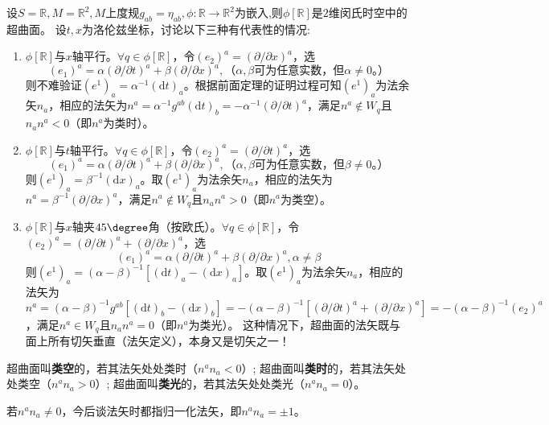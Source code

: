 \begin{example}
	设$S = \mathbb{R}, M = \mathbb{R}^2, M$上度规$g_{ab} = \eta_{ab}, \phi \colon \mathbb{R} \to \mathbb{R}^2$为嵌入,则$\phi[\mathbb{R}]$是$2$维闵氏时空中的超曲面。
	设$t, x$为洛伦兹坐标，讨论以下三种有代表性的情况:
	\begin{enumerate}[（1）]
		\item $\phi[\mathbb{R}]$与$x$轴平行。$\forall q \in \phi[\mathbb{R}]$，令$(e_2)^a = (\partial / \partial x)^a$，选
		$$(e_1)^a = \alpha(\partial / \partial t)^a + \beta(\partial / \partial x)^a, \text{（$\alpha, \beta$可为任意实数，但$\alpha \neq 0$。）}$$
		则不难验证$(e^1)_a = \alpha^{-1}(\mathrm{d}t)_a$。根据前面定理的证明过程可知$(e^1)_a$为法余矢$n_a$，相应的法矢为$n^a = \alpha^{-1}g^{ab}(\mathrm{d}t)_b = -\alpha^{-1}(\partial / \partial t)^a$，满足$n^a \notin W_q$且$n_an^a < 0$（即$n^a$为类时）。
		\item $\phi[\mathbb{R}]$与$t$轴平行。$\forall q \in \phi[\mathbb{R}]$，令$(e_2)^a = (\partial / \partial t)^a$，选
		$$(e_1)^a = \alpha(\partial / \partial t)^a + \beta(\partial / \partial x)^a, \text{（$\alpha, \beta$可为任意实数，但$\beta \neq 0$。）}$$
		则$(e^1)_a = \beta^{-1}(\mathrm{d}x)_a$。取$(e^1)_a$为法余矢$n_a$，相应的法矢为$n^a = \beta^{-1}(\partial / \partial x)^a$，满足$n^a \notin W_q$且$n_an^a > 0$（即$n^a$为类空）。
		\item $\phi[\mathbb{R}]$与$x$轴夹$45\degree$角（按欧氏）。$\forall q \in \phi[\mathbb{R}]$，令$(e_2)^a = (\partial / \partial t)^a + (\partial / \partial x)^a$，选
		$$(e_1)^a = \alpha(\partial / \partial t)^a + \beta(\partial / \partial x)^a, \alpha \neq \beta$$
		则$(e^1)_a = (\alpha - \beta)^{-1}[(\mathrm{d}t)_a - (\mathrm{d}x)_a]$。取$(e^1)_a$为法余矢$n_a$，相应的法矢为$n^a = (\alpha - \beta)^{-1}g^{ab}[(\mathrm{d}t)_b - (\mathrm{d}x)_b] = -(\alpha - \beta)^{-1}[(\partial / \partial t)^a + (\partial / \partial x)^a] = -(\alpha - \beta)^{-1}(e_2)^a$，满足$n^a \in W_q$且$n_an^a = 0$（即$n^a$为类光）。
		这种情况下，超曲面的法矢既与面上所有切矢垂直（法矢定义），本身又是切矢之一！
	\end{enumerate}
\end{example}

\begin{definition}
	超曲面叫\textbf{类空}的，若其法矢处处类时（$n^an_a < 0$）;
	超曲面叫\textbf{类时}的，若其法矢处处类空（$n^an_a > 0$）;
	超曲面叫\textbf{类光}的，若其法矢处处类光（$n^an_a = 0$）。
\end{definition}

若$n^an_a \neq 0$，今后谈法矢时都指归一化法矢，即$n^an_a = \pm 1$。

